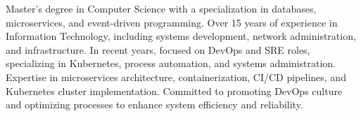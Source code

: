 

\begin{cvparagraph}

Master's degree in Computer Science with a specialization in databases, microservices, and event-driven programming. Over 15 years of experience in Information Technology, including systems development, network administration, and infrastructure. In recent years, focused on DevOps and SRE roles, specializing in Kubernetes, process automation, and systems administration. Expertise in microservices architecture, containerization, CI/CD pipelines, and Kubernetes cluster implementation. Committed to promoting DevOps culture and optimizing processes to enhance system efficiency and reliability.

\end{cvparagraph}

